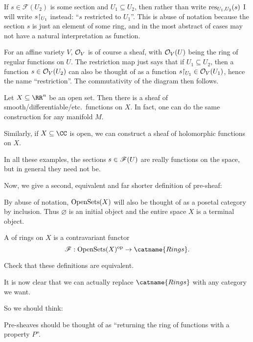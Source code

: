 \begin{abuse}
	If $s \in \mathscr F(U_2)$ is some section and $U_1 \subseteq U_2$,
	then rather than write $\operatorname{res}_{U_1,U_2}(s)$
	I will write $s\restrict{U_1}$ instead:
	``$s$ restricted to $U_1$''.
	This is abuse of notation because the section $s$ is just
	an element of some ring, and in the most abstract of cases
	may not have a natural interpretation as function.
\end{abuse}

\begin{example}
	\listhack
	\begin{enumerate}[(a)]
		\ii For an affine variety $V$, $\mathcal O_V$ is of course a sheaf,
		with $\mathcal O_V(U)$ being the ring of regular functions on $U$.
		The restriction map just says that if $U_1 \subseteq U_2$,
		then a function $s \in \mathcal O_V(U_2)$ can also be thought of as
		a function $s \restrict{U_1} \in \OO_V(U_1)$,
		hence the name ``restriction''.
		The commutativity of the diagram then follows.
		
		\ii Let $X \subseteq \RR^n$ be an open set.
		Then there is a sheaf of smooth/differentiable/etc.\ functions on $X$.
		In fact, one can do the same construction for any manifold $M$.

		\ii Similarly, if $X \subseteq \CC$ is open,
		we can construct a sheaf of holomorphic functions on $X$.
	\end{enumerate}
	In all these examples, the sections $s \in \mathscr F(U)$
	are really functions on the space, but in general they need not be.
\end{example}

Now, we give a second, equivalent and far shorter definition of pre-sheaf:
\begin{abuse}
	By abuse of notation, $\operatorname{OpenSets}(X)$ will also be thought of as a
	posetal category by inclusion. Thus $\varnothing$ is an initial object
	and the entire space $X$ is a terminal object.
\end{abuse}
\begin{definition}
	A  of rings on $X$ is a contravariant functor
	\[ \SF : \Opens(X)\op \to \catname{Rings}. \]
\end{definition}
\begin{ques}
	Check that these definitions are equivalent.
\end{ques}
It is now clear that we can actually replace $\catname{Rings}$
with any category we want.

So we should think:
\begin{moral}
	Pre-sheaves should be thought of as
	``returning the ring of functions with a property $P$''.
\end{moral}

